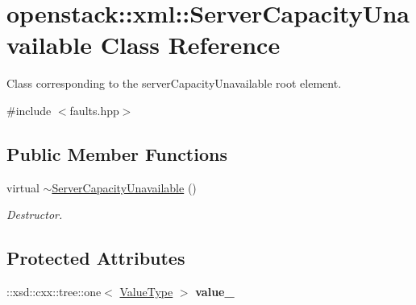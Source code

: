 \hypertarget{classopenstack_1_1xml_1_1ServerCapacityUnavailable}{
\section{openstack::xml::ServerCapacityUnavailable Class Reference}
\label{classopenstack_1_1xml_1_1ServerCapacityUnavailable}
}


Class corresponding to the serverCapacityUnavailable root element.  




{\ttfamily \#include $<$faults.hpp$>$}

\subsection*{Public Member Functions}
\begin{DoxyCompactItemize}
\item 
\hypertarget{classopenstack_1_1xml_1_1ServerCapacityUnavailable_abbd614cb988a85acd738c6c1fe455c2c}{
virtual \hyperlink{classopenstack_1_1xml_1_1ServerCapacityUnavailable_abbd614cb988a85acd738c6c1fe455c2c}{$\sim$ServerCapacityUnavailable} ()}
\label{classopenstack_1_1xml_1_1ServerCapacityUnavailable_abbd614cb988a85acd738c6c1fe455c2c}

\begin{DoxyCompactList}\small\item\em Destructor. \item\end{DoxyCompactList}\end{DoxyCompactItemize}
\subsection*{Protected Attributes}
\begin{DoxyCompactItemize}
\item 
\hypertarget{classopenstack_1_1xml_1_1ServerCapacityUnavailable_af9a070cc6e4133aae215f7269bb28635}{
::xsd::cxx::tree::one$<$ \hyperlink{classopenstack_1_1xml_1_1ServerCapacityUnavailableAPIFault}{ValueType} $>$ {\bfseries value\_\-}}
\label{classopenstack_1_1xml_1_1ServerCapacityUnavailable_af9a070cc6e4133aae215f7269bb28635}

\end{DoxyCompactItemize}
